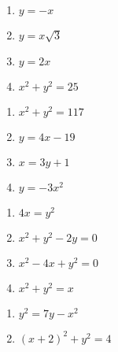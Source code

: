 \documentclass{ximera}
\begin{document}
\begin{multicols}{4} 

\begin{enumerate}

\setcounter{enumi}{\value{HW}}

\item $y = -x$  
\item $y = x\sqrt{3}$  
\item $y = 2x$ \label{solvethetafour} 
\item $x^2 + y^2 = 25$

\setcounter{HW}{\value{enumi}}

\end{enumerate}

\end{multicols}

\begin{multicols}{4} 

\begin{enumerate}

\setcounter{enumi}{\value{HW}}

\item $x^{2} + y^{2} = 117$
\item $y = 4x - 19$
\item $x = 3y + 1$
\item $y = -3x^{2}$

\setcounter{HW}{\value{enumi}}

\end{enumerate}

\end{multicols}

\begin{multicols}{4} 

\begin{enumerate}

\setcounter{enumi}{\value{HW}}

\item $4x = y^2$
\item $x^2 + y^2 - 2y = 0$
\item $x^2 -4x + y^2 = 0$
\item $x^2 + y^2 = x$

\setcounter{HW}{\value{enumi}}

\end{enumerate}

\end{multicols}

\begin{multicols}{2} 

\begin{enumerate}

\setcounter{enumi}{\value{HW}}

\item $y^2 = 7y - x^2$
\item $(x+2)^2 + y^2 = 4$

\setcounter{HW}{\value{enumi}}

\end{enumerate}

\end{multicols}
\end{document}
